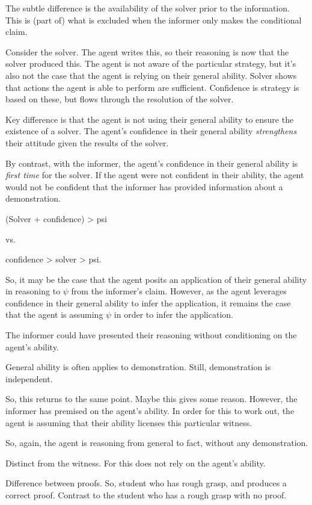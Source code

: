 \documentclass[10pt]{article}
\begin{document}
The subtle difference is the availability of the solver prior to the information.
This is (part of) what is excluded when the informer only makes the conditional claim.

Consider the solver.
The agent writes this, so their reasoning is now that the solver produced this.
The agent is not aware of the particular strategy, but it's also not the case that the agent is relying on their general ability.
Solver shows that actions the agent is able to perform are sufficient.
Confidence is strategy is based on these, but flows through the resolution of the solver.

Key difference is that the agent is not using their general ability to ensure the existence of a solver.
The agent's confidence in their general ability \emph{strengthens} their attitude given the results of the solver.

By contrast, with the informer, the agent's confidence in their general ability is \emph{first time} for the solver.
If the agent were not confident in their ability, the agent would not be confident that the informer has provided information about a demonstration.

(Solver + confidence) > psi

vs.\

confidence  > solver > psi.

So, it may be the case that the agent posits an application of their general ability in reasoning to \(\psi\) from the informer's claim.
However, as the agent leverages confidence in their general ability to infer the application, it remains the case that the agent is assuming \(\psi\) in order to infer the application.

The informer could have presented their reasoning without conditioning on the agent's ability.

General ability is often applies to demonstration.
Still, demonstration is independent.

So, this returns to the same point.
Maybe this gives some reason.
However, the informer has premised on the agent's ability.
In order for this to work out, the agent is assuming that their ability licenses this particular witness.

So, again, the agent is reasoning from general to fact, without any demonstration.


Distinct from the witness.
For this does not rely on the agent's ability.

Difference between proofs.
So, student who has rough grasp, and produces a correct proof.
Contrast to the student who has a rough grasp with no proof.
\end{document}
